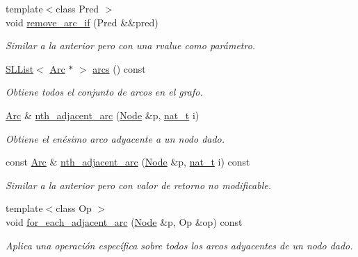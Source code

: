 \begin{DoxyCompactItemize}
{\footnotesize template$<$class Pred $>$ }\\void \hyperlink{class_designar_1_1_base_graph_a0e516bee6e0247de6bdd207de57caad6}{remove\+\_\+arc\+\_\+if} (Pred \&\&pred)
\begin{DoxyCompactList}\small\item\em Similar a la anterior pero con una rvalue como parámetro. \end{DoxyCompactList}\item 
\hyperlink{class_designar_1_1_s_l_list}{S\+L\+List}$<$ \hyperlink{namespace_designar_a3f55fb5513d62ff47cbc8f72b8e95d6f}{Arc} $\ast$ $>$ \hyperlink{class_designar_1_1_base_graph_afeff075f6386a31a06a8211e5d11fe1a}{arcs} () const
\begin{DoxyCompactList}\small\item\em Obtiene todos el conjunto de arcos en el grafo. \end{DoxyCompactList}\item 
\hyperlink{namespace_designar_a3f55fb5513d62ff47cbc8f72b8e95d6f}{Arc} \& \hyperlink{class_designar_1_1_base_graph_a91c96135db95b2021510b769aedef850}{nth\+\_\+adjacent\+\_\+arc} (\hyperlink{namespace_designar_a5af326c65aa2bd26b26c410f2030d09e}{Node} \&p, \hyperlink{namespace_designar_aa72662848b9f4815e7bf31a7cf3e33d1}{nat\+\_\+t} i)
\begin{DoxyCompactList}\small\item\em Obtiene el enésimo arco adyacente a un nodo dado. \end{DoxyCompactList}\item 
const \hyperlink{namespace_designar_a3f55fb5513d62ff47cbc8f72b8e95d6f}{Arc} \& \hyperlink{class_designar_1_1_base_graph_a53b69f16a427a993ca2ce8bc3a5a5028}{nth\+\_\+adjacent\+\_\+arc} (\hyperlink{namespace_designar_a5af326c65aa2bd26b26c410f2030d09e}{Node} \&p, \hyperlink{namespace_designar_aa72662848b9f4815e7bf31a7cf3e33d1}{nat\+\_\+t} i) const
\begin{DoxyCompactList}\small\item\em Similar a la anterior pero con valor de retorno no modificable. \end{DoxyCompactList}\item 
{\footnotesize template$<$class Op $>$ }\\void \hyperlink{class_designar_1_1_base_graph_a5e35c97bdf055f67e744f7d961ccb6a9}{for\+\_\+each\+\_\+adjacent\+\_\+arc} (\hyperlink{namespace_designar_a5af326c65aa2bd26b26c410f2030d09e}{Node} \&p, Op \&op) const
\begin{DoxyCompactList}\small\item\em Aplica una operación específica sobre todos los arcos adyacentes de un nodo dado. \end{DoxyCompactList}\item 

\end{DoxyCompactItemize}
